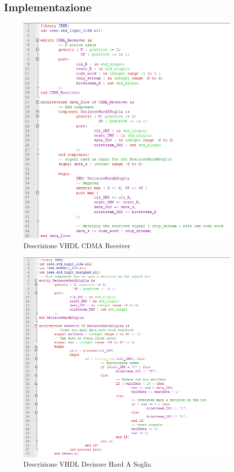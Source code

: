 \documentclass[a4paper,12pt]{article}
\begin{document}
  \subsection{Implementazione}
    \begin{figure}[H]
      \centering
      \includegraphics[width=\textwidth]{img/CDMAReceiver.png}
      \caption{Descrizione VHDL CDMA Receiver}
      \label{fig:vhdl:cdma}
    \end{figure}
    \begin{figure}[H]
      \centering
      \includegraphics[width=\textwidth]{img/DecisoreHardASoglia.png}
      \caption{Descrizione VHDL Decisore Hard A Soglia}
      \label{fig:vhdl:DHS}
    \end{figure}  
\end{document}
